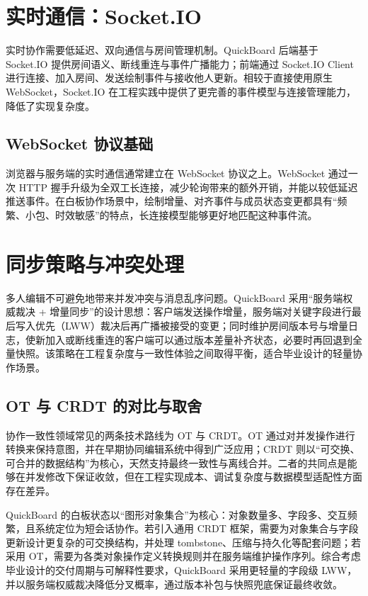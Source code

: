 \section{实时通信：Socket.IO}
实时协作需要低延迟、双向通信与房间管理机制。QuickBoard 后端基于 Socket.IO 提供房间语义、断线重连与事件广播能力；前端通过 Socket.IO Client 进行连接、加入房间、发送绘制事件与接收他人更新。相较于直接使用原生 WebSocket，Socket.IO 在工程实践中提供了更完善的事件模型与连接管理能力，降低了实现复杂度。\cite{socketio}

\subsection{WebSocket 协议基础}
浏览器与服务端的实时通信通常建立在 WebSocket 协议之上。WebSocket 通过一次 HTTP 握手升级为全双工长连接，减少轮询带来的额外开销，并能以较低延迟推送事件\cite{rfc6455}。在白板协作场景中，绘制增量、对齐事件与成员状态变更都具有“频繁、小包、时效敏感”的特点，长连接模型能够更好地匹配这种事件流。

\section{同步策略与冲突处理}
多人编辑不可避免地带来并发冲突与消息乱序问题。QuickBoard 采用“服务端权威裁决 + 增量同步”的设计思想：客户端发送操作增量，服务端对关键字段进行最后写入优先（LWW）裁决后再广播被接受的变更；同时维护房间版本号与增量日志，使新加入或断线重连的客户端可以通过版本差量补齐状态，必要时再回退到全量快照。该策略在工程复杂度与一致性体验之间取得平衡，适合毕业设计的轻量协作场景。

\subsection{OT 与 CRDT 的对比与取舍}
协作一致性领域常见的两条技术路线为 OT 与 CRDT。OT 通过对并发操作进行转换来保持意图，并在早期协同编辑系统中得到广泛应用\cite{sun_ellis_1998}；CRDT 则以“可交换、可合并的数据结构”为核心，天然支持最终一致性与离线合并\cite{shapiro_rr7506_2011}。二者的共同点是能够在并发修改下保证收敛，但在工程实现成本、调试复杂度与数据模型适配性方面存在差异。

QuickBoard 的白板状态以“图形对象集合”为核心：对象数量多、字段多、交互频繁，且系统定位为短会话协作。若引入通用 CRDT 框架，需要为对象集合与字段更新设计更复杂的可交换结构，并处理 tombstone、压缩与持久化等配套问题；若采用 OT，需要为各类对象操作定义转换规则并在服务端维护操作序列。综合考虑毕业设计的交付周期与可解释性要求，QuickBoard 采用更轻量的字段级 LWW，并以服务端权威裁决降低分叉概率，通过版本补包与快照兜底保证最终收敛。

